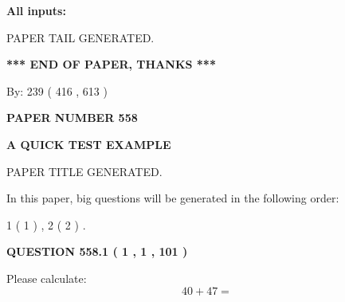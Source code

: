 \documentclass[12pt]{article}
\begin{document}
   
\noindent{}
   
   
   
   
\noindent\vspace{0.1in}\hspace{-0.08in} {\textbf{\Large{All inputs: }}}
   
   
   
   
   
   
 \vspace{0.2in}
 
   
   
\vspace{2.0in} PAPER TAIL GENERATED.
   
   
   
   
\vspace{1.0in} 
{\textbf{\large{ *** END OF PAPER, THANKS *** }}} 
   
   
\hspace{1.0in} By: 
 239 ( 416 ,  613 )
   
   
   
   
\newpage 
\setcounter{page}{ 
   558001 } 
   
   
   
   
 {\textbf{ \Large{ PAPER NUMBER  558  }}}
   
   
\vspace{0.2in}
   
   
   
   
   
   
   
   
 \vspace{0.2in}
{\LARGE {\textbf{ A QUICK TEST EXAMPLE}}}
   
   
 PAPER TITLE GENERATED.
   
   
   
\vspace{0.2in}
   
In this paper, big questions will be generated in the following order: 
   
   
   1 ( 1 )
 ,
   2 ( 2 )
 .
  
\vspace{0.2in}
  
{\textbf{\Large{QUESTION
558.1 
 ( 1 , 1 , 101 )
}}}
  
  
 
Please calculate:
\begin{equation}
40 +  %
47 = \nonumber
\end{equation}
 
\end{document}
